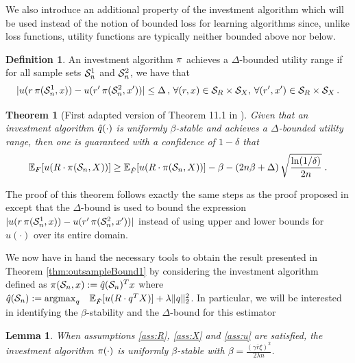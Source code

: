 \documentclass[]{interact}
\theoremstyle{plain}%
\newtheorem{lemma}[theorem]{Lemma}
\theoremstyle{definition}
\newtheorem{definition}[theorem]{Definition}
\theoremstyle{remark}
\def\Expect{{\mathbb E}}
\def\argmax{\mathop{\rm argmax}}
\newcommand{\0}{\V{0}}
\newcommand{\1}{\V{1}}
\newcommand{\xMax}{\xi}
\theoremstyle{plain}
\newtheorem{thm}{Theorem}
\theoremstyle{definition}
\begin{document}
We also introduce an additional property of the  investment algorithm which will be used instead of the notion of bounded loss for learning algorithms since, unlike loss functions, utility functions are typically neither bounded above nor below.
\begin{definition}
An investment algorithm ${\pi}$ achieves a $\Delta$-bounded utility range if for all sample sets $\mathcal{S}_n^1$ and $\mathcal{S}_n^2$, we have that
\[     |u(r\,{\pi}(\mathcal{S}_n^1, x))-u(r'\,{\pi}(\mathcal{S}_n^2, x'))| \leq \Delta\,,\,\forall (r,x)\in{\mathcal{S}_R}\times {\mathcal{S}_X},\,\forall(r',x')\in{\mathcal{S}_R}\times{\mathcal{S}_X}\,.\]
\end{definition}


\begin{thm}[First adapted version of Theorem 11.1 in \cite{mohri2012foundations}]\label{thm:thm111}
  Given that  an investment algorithm ${\hat{q}}(\cdot)$ is uniformly $\beta$-stable and achieves a $\Delta$-bounded utility range, then one
  is guaranteed with a confidence of $1-\delta$ that
  \[
    \Expect_{\F}[u(R\cdot\investA(\Sn,X))] \geq \Expect_{\hat\F}[u(R\cdot\investA(\Sn,X))] - \beta -
    \left(2n\beta+\Delta\right)\sqrt{\frac{\ln(1/\delta)}{2n}}\;.
  \]
\end{thm}

The proof of this theorem follows exactly the same steps as the proof proposed in \cite{mohri2012foundations} except that the $\Delta$-bound is used to bound the expression $ |u(r\,{\pi}(\mathcal{S}_n^1, x)) - u(r'\,{\pi}(\mathcal{S}_n^2,x'))| $ instead of using upper and lower bounds for $u(\cdot)$ over its entire domain.

We now have in hand the necessary tools to obtain the result presented in Theorem \ref{thm:outsampleBound1} by considering the investment algorithm defined as ${\pi}(\mathcal{S}_n,x):={\hat{q}}(\mathcal{S}_n)^T x$
where $\qhat(\Sn):=\argmax_q \;\;\;\Expect_\Fhat[u(R\cdot q^TX)]+\lambda\|q\|_2^2$. In particular, we will be interested in identifying the $\beta$-stability and the $\Delta$-bound for this estimator

\begin{lemma}\label{beta-bound}
  When assumptions \ref{ass:R}, \ref{ass:X} and \ref{ass:u} are satisfied, the investment algorithm ${\pi}(\cdot)$
 is uniformly $\beta$-stable with  $ \beta = \frac{(\gamma\bar r\xMax)^2}{2\lambda n}$. 
\end{lemma}
\end{document}
